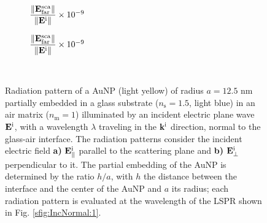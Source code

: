 \begin{figure}[h!]
    \centering
    \def\svgwidth{.8\textwidth}
    \\
        \vspace*{-16.5em}%
        \hspace*{-.2\textwidth}%
    \begin{subfigure}{.4\textwidth}\caption{\footnotesize$\dfrac{\norm{\vb{E}^\text{sca}_\text{far}}}{\norm{\vb{E}^\text{i}}} \times 10^{-9}$  }\label{sfig:Far:IncNorm:a}\end{subfigure}%
    \begin{subfigure}{.4\textwidth}\caption{\footnotesize$\dfrac{\norm{\vb{E}^\text{sca}_\text{far}}}{\norm{\vb{E}^\text{i}}} \times 10^{-9}$  }\label{sfig:Far:IncNorm:b}\end{subfigure}\\[14em]
    \caption[  Radiation pattern of a AuNP supported on a substrate illuminated at oblique incidence ]{Radiation pattern of a AuNP (light yellow) of radius $a = 12.5$ nm partially embedded in a glass substrate ($n_\text{s} = 1.5$, light blue) in an air matrix ($n_\text{m} = 1$) illuminated by an incident electric plane wave $\vb{E}^\text{i}$, with a wavelength $\lambda$ traveling in the $\vb{k}^\text{i}$ direction, normal to the glass-air interface. The radiation patterns consider the incident electric field \textbf{a)} $\vb{E}^\text{i}_\parallel$ parallel to the scattering plane  and \textbf{b)} $\vb{E}^\text{i}_\perp$ perpendicular to it. The partial embedding of the AuNP is determined by the ratio $h/a$, with $h$ the distance between the interface and the center of the AuNP and $a$ its radius; each  radiation pattern is evaluated at the wavelength of the LSPR shown in Fig. \ref{sfig:IncNormal:1}.}
    \label{fig:Far:IncNorm}
\end{figure}

